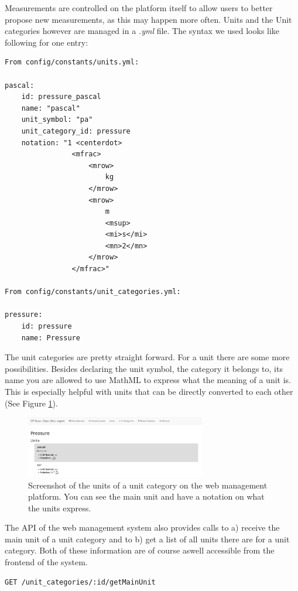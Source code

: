 Measurements are controlled on the platform itself to allow users to
better propose new measurements, as this may happen more often. Units
and the Unit categories however are managed in a \emph{.yml} file. The
syntax we used looks like following for one entry:

\begin{verbatim}
From config/constants/units.yml:

pascal:
	id: pressure_pascal
	name: "pascal"
	unit_symbol: "pa"
	unit_category_id: pressure
	notation: "1 <centerdot>
				<mfrac>
					<mrow>
						kg
					</mrow>
					<mrow>
						m 
						<msup>
						<mi>s</mi>
						<mn>2</mn>
					</mrow>
				</mfrac>"

From config/constants/unit_categories.yml:

pressure:
	id: pressure
	name: Pressure
\end{verbatim}

The unit categories are pretty straight forward. For a unit there are
some more possibilities. Besides declaring the unit symbol, the category
it belongs to, its name you are allowed to use MathML to express what
the meaning of a unit is. This is especially helpful with units that can
be directly converted to each other (See Figure \ref{image_unit}).


\begin{figure}
	\begin{center}
		\includegraphics[width=0.7\textwidth]{08_web_mgmt/images/unit_frontend.png}
		\caption{Screenshot of the units of a unit category on the web
			management platform. You can see the main unit and have a notation on
			what the units express.}
		\label{image_unit}
	\end{center}
\end{figure}



The API of the web management system also provides calls to a) receive
the main unit of a unit category and to b) get a list of all units there
are for a unit category. Both of these information are of course aswell
accessible from the frontend of the system.

\begin{verbatim}
GET /unit_categories/:id/getMainUnit
\end{verbatim}

